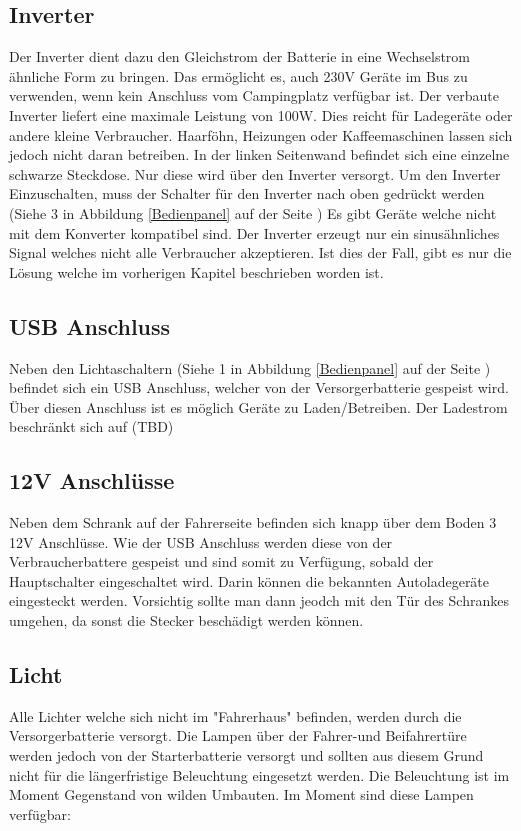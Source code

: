 \subsection{Inverter}
Der Inverter dient dazu den Gleichstrom der Batterie in eine Wechselstrom ähnliche Form zu bringen.
Das ermöglicht es, auch 230V Geräte im Bus zu verwenden, wenn kein Anschluss vom Campingplatz verfügbar ist.
Der verbaute Inverter liefert eine maximale Leistung von 100W.
Dies reicht für Ladegeräte oder andere kleine Verbraucher.
Haarföhn, Heizungen oder Kaffeemaschinen lassen sich jedoch nicht daran betreiben.
In der linken Seitenwand befindet sich eine einzelne schwarze Steckdose.
Nur diese wird über den Inverter versorgt.
Um den Inverter Einzuschalten, muss der Schalter für den Inverter nach oben gedrückt werden (Siehe 3 in Abbildung \ref{Bedienpanel} auf der Seite \pageref{Bedienpanel})
Es gibt Geräte welche nicht mit dem Konverter kompatibel sind. 
Der Inverter erzeugt nur ein sinusähnliches Signal welches nicht alle Verbraucher akzeptieren.
Ist dies der Fall, gibt es nur die Lösung welche im vorherigen Kapitel beschrieben worden ist.

\subsection{USB Anschluss}
Neben den Lichtaschaltern  (Siehe 1 in Abbildung \ref{Bedienpanel} auf der Seite \pageref{Bedienpanel}) befindet sich ein USB Anschluss, welcher von der Versorgerbatterie gespeist wird.
Über diesen Anschluss ist es möglich Geräte zu Laden/Betreiben. Der Ladestrom beschränkt sich auf (TBD)

\subsection{12V Anschlüsse}
Neben dem Schrank auf der Fahrerseite befinden sich knapp über dem Boden 3 12V Anschlüsse.
Wie der USB Anschluss werden diese von der Verbraucherbattere gespeist und sind somit zu Verfügung, sobald der Hauptschalter eingeschaltet wird. 
Darin können die bekannten Autoladegeräte eingesteckt werden.
Vorsichtig sollte man dann jeodch mit den Tür des Schrankes umgehen, da sonst die Stecker beschädigt werden können.

\subsection{Licht}
Alle Lichter welche sich nicht im "Fahrerhaus" befinden, werden durch die Versorgerbatterie versorgt.
Die Lampen über der Fahrer-und Beifahrertüre werden jedoch von der Starterbatterie versorgt und sollten aus diesem Grund nicht für die längerfristige Beleuchtung eingesetzt werden.
Die Beleuchtung ist im Moment Gegenstand von wilden Umbauten.
Im Moment sind diese Lampen verfügbar:
